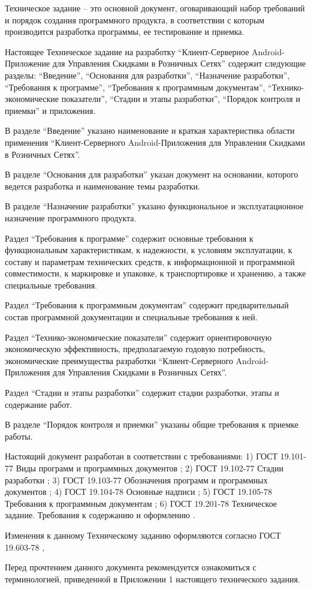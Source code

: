 
\tab[0.75cm] Техническое задание – это основной документ, оговаривающий набор требований и
порядок создания программного продукта, в соответствии с которым производится разработка
программы, ее тестирование и приемка.

Настоящее Техническое задание на разработку ``Клиент-Серверное Android-Приложение для Управления Скидками в Розничных Сетях'' содержит следующие разделы: ``Введение'', ``Основания для разработки'',
``Назначение разработки'', ``Требования к программе'', ``Требования к программным документам'',
``Технико-экономические показатели'', ``Стадии и этапы разработки'', ``Порядок контроля и
приемки'' и приложения.

В разделе ``Введение'' указано наименование и краткая характеристика области применения
``Клиент-Серверного Android-Приложения для Управления Скидками в Розничных Сетях''.

В разделе ``Основания для разработки'' указан документ на основании, которого ведется
разработка и наименование темы разработки.

В разделе ``Назначение разработки'' указано функциональное и эксплуатационное
назначение программного продукта.

Раздел ``Требования к программе'' содержит основные требования к функциональным
характеристикам, к надежности, к условиям эксплуатации, к составу и параметрам технических
средств, к информационной и программной совместимости, к маркировке и упаковке, к
транспортировке и хранению, а также специальные требования.

Раздел ``Требования к программным документам'' содержит предварительный состав
программной документации и специальные требования к ней.

Раздел ``Технико-экономические показатели'' содержит ориентировочную экономическую
эффективность, предполагаемую годовую потребность, экономические преимущества разработки
``Клиент-Серверного Android-Приложения для Управления Скидками в Розничных Сетях''.

Раздел ``Стадии и этапы разработки'' содержит стадии разработки, этапы и содержание
работ.

В разделе ``Порядок контроля и приемки'' указаны общие требования к приемке работы.

Настоящий документ разработан в соответствии с требованиями:
1) ГОСТ 19.101-77 Виды программ и программных документов \cite{gost_types_of_software};
2) ГОСТ 19.102-77 Стадии разработки \cite{gost_stages_of_devel};
3) ГОСТ 19.103-77 Обозначения программ и программных документов \cite{gost_marking_software};
4) ГОСТ 19.104-78 Основные надписи \cite{gost_main_signs};
5) ГОСТ 19.105-78 Требования к программным документам \cite{gost_demands_for_docs};
6) ГОСТ 19.201-78 Техническое задание. Требования к содержанию и оформлению \cite{gost_tz}.


Изменения к данному Техническому заданию оформляются согласно ГОСТ 19.603-78 \cite{gost_main_rules_change},

Перед прочтением данного документа рекомендуется ознакомиться с терминологией,
приведенной в Приложении 1 настоящего технического задания.
